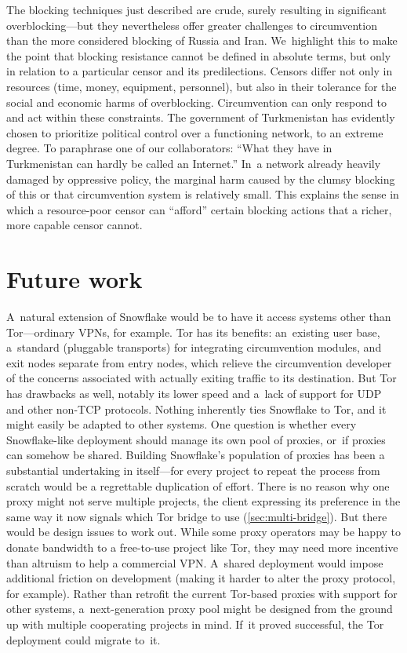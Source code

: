 \documentclass[letterpaper,twocolumn]{article}
\begin{document}
The blocking techniques just described are crude,
surely resulting in significant overblocking---but
they nevertheless offer greater challenges to circumvention
than the more considered blocking of Russia and Iran.
We~highlight this to make the point that blocking resistance
cannot be defined in absolute terms,
but only in relation to a particular censor
and its predilections.
Censors differ not only in resources
(time, money, equipment, personnel),
but also in their tolerance
for the social and economic harms of overblocking.
Circumvention can only respond to and act within these constraints.
The government of Turkmenistan has evidently chosen
to prioritize political control
over a functioning network, to an extreme degree.
To paraphrase one of our collaborators:
``What they have in Turkmenistan can hardly be called an Internet.''
In~a network already heavily damaged by oppressive policy,
the marginal harm caused by the clumsy blocking of
this or that circumvention system is relatively small.
This explains the sense in which a resource-poor censor
can ``afford'' certain blocking actions
that a richer, more capable censor cannot.

\section{Future work}
\label{sec:future}

A~natural extension of Snowflake would be
to have it access systems other than Tor---ordinary
VPNs, for example.
Tor has its benefits:
an~existing user base,
a~standard (pluggable transports) for integrating
circumvention modules,
and exit nodes separate from entry nodes,
which relieve the circumvention developer of the concerns associated
with actually exiting traffic to its destination.
But Tor has drawbacks as well,
notably its lower speed and
a~lack of support for UDP and other non-TCP protocols.
Nothing inherently ties Snowflake to Tor,
and it might easily be adapted to other systems.
One question is whether every Snowflake-like deployment
should manage its own pool of proxies,
or~if proxies can somehow be shared.
Building Snowflake's population of proxies
has been a substantial undertaking in itself---for
every project to repeat the process from scratch
would be a regrettable duplication of effort.
There is no reason why one proxy might not
serve multiple projects,
the client expressing its preference
in the same way it now signals which Tor bridge to use (\autoref{sec:multi-bridge}).
But there would be design issues to work out.
While some proxy operators may be happy to donate
bandwidth to a free-to-use project like Tor,
they may need more incentive than altruism to help a commercial VPN.
A~shared deployment would impose additional friction on development
(making it harder to alter the proxy protocol, for example).
Rather than retrofit the current Tor-based proxies
with support for other systems,
a~next-generation proxy pool might be designed
from the ground up with multiple cooperating projects in mind.
If~it proved successful,
the Tor deployment could migrate to~it.
\end{document}
